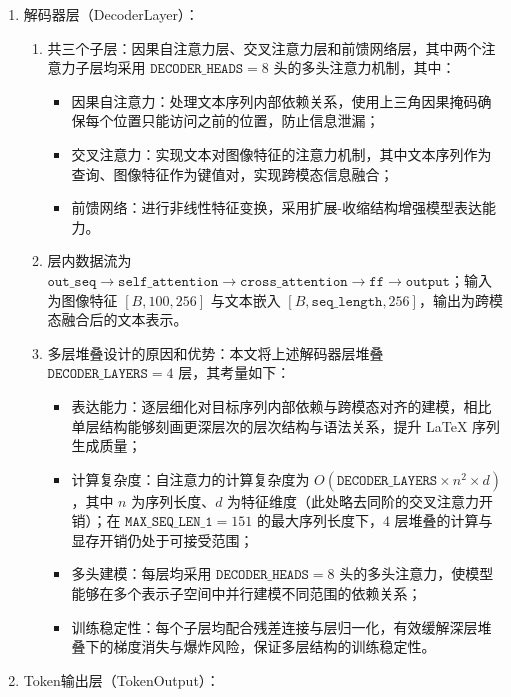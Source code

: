 \begin{enumerate}[label={（\arabic*）}, leftmargin=2em, labelsep=0.5em, itemsep=0pt]
\begin{enumerate}[label={（\alph*）}, leftmargin=2em, labelsep=0.5em, itemsep=0pt]
\end{enumerate}
    \item 解码器层（DecoderLayer）：
        \begin{enumerate}[label={（\alph*）}, leftmargin=2em, labelsep=0.5em, itemsep=0pt]
            \item 共三个子层：因果自注意力层、交叉注意力层和前馈网络层，其中两个注意力子层均采用 $\texttt{DECODER\_HEADS}=8$ 头的多头注意力机制，其中：
            \begin{itemize}
                \item 因果自注意力：处理文本序列内部依赖关系，使用上三角因果掩码确保每个位置只能访问之前的位置，防止信息泄漏；
                \item 交叉注意力：实现文本对图像特征的注意力机制，其中文本序列作为查询、图像特征作为键值对，实现跨模态信息融合；
                \item 前馈网络：进行非线性特征变换，采用扩展-收缩结构增强模型表达能力。
            \end{itemize}
            \item 层内数据流为 $\texttt{out\_seq} \rightarrow \texttt{self\_attention} \rightarrow \texttt{cross\_attention} \rightarrow \texttt{ff} \rightarrow \texttt{output}$；输入为图像特征 $[B, 100, 256]$ 与文本嵌入 $[B, \texttt{seq\_length}, 256]$，输出为跨模态融合后的文本表示。
            \item 多层堆叠设计的原因和优势：本文将上述解码器层堆叠 $\texttt{DECODER\_LAYERS}=4$ 层，其考量如下：
            \begin{itemize}
                \item 表达能力：逐层细化对目标序列内部依赖与跨模态对齐的建模，相比单层结构能够刻画更深层次的层次结构与语法关系，提升 LaTeX 序列生成质量；
                \item 计算复杂度：自注意力的计算复杂度为 $O(\texttt{DECODER\_LAYERS} \times n^2 \times d)$，其中 $n$ 为序列长度、$d$ 为特征维度（此处略去同阶的交叉注意力开销）；在 $\texttt{MAX\_SEQ\_LEN\_1}=151$ 的最大序列长度下，$4$ 层堆叠的计算与显存开销仍处于可接受范围；
                \item 多头建模：每层均采用 $\texttt{DECODER\_HEADS}=8$ 头的多头注意力，使模型能够在多个表示子空间中并行建模不同范围的依赖关系；
                \item 训练稳定性：每个子层均配合残差连接与层归一化，有效缓解深层堆叠下的梯度消失与爆炸风险，保证多层结构的训练稳定性。
            \end{itemize}
        \end{enumerate}
    \item Token输出层（TokenOutput）：

\end{enumerate}

